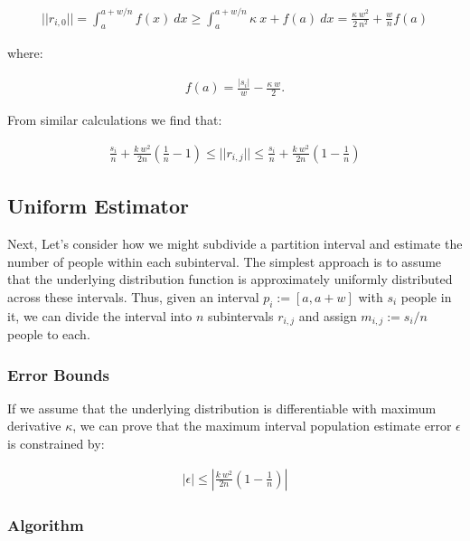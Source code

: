 \documentclass[]{article}
\begin{document}
\begin{align*}
||r_{i, 0}|| = \int_a^{a+w/n} f (x)\ dx \ge \int_a^{a+w/n} \kappa\ x + f (a)\ dx = \frac{\kappa\ w^2}{2\ n^2}  + \frac{w}{n}f (a)
\end{align*}

where:

\begin{align*}
f (a) = \frac{|s_i|}{w} - \frac{\kappa\ w}{2}.
\end{align*}

From similar calculations we find that:

\begin{align*}
\frac{s_i}{n} + \frac{k\ w^2}{2n}(\frac{1}{n} - 1) \le ||r_{i, j}|| \le \frac{s_i}{n} + \frac{k\ w^2}{2n}(1 - \frac{1}{n})
\end{align*}

\hypertarget{uniform-estimator}{%
\subsection{Uniform Estimator}\label{uniform-estimator}}

Next, Let's consider how we might subdivide a partition interval and
estimate the number of people within each subinterval. The simplest
approach is to assume that the underlying distribution function is
approximately uniformly distributed across these intervals. Thus, given
an interval \(p_i := [a, a+w]\) with \(s_i\) people in it, we can divide
the interval into \(n\) subintervals \(r_{i, j}\) and assign
\(m_{i,j} := s_i/n\) people to each.

\hypertarget{error-bounds}{%
\subsubsection{Error Bounds}\label{error-bounds}}

If we assume that the underlying distribution is differentiable with
maximum derivative \(\kappa\), we can prove that the maximum interval
population estimate error \(\epsilon\) is constrained by:

\begin{align*}
|\epsilon| \le |\frac{k\ w^2}{2n}(1 - \frac{1}{n})|
\end{align*}

\hypertarget{algorithm}{%
\subsubsection{Algorithm}\label{algorithm}}
\end{document}
